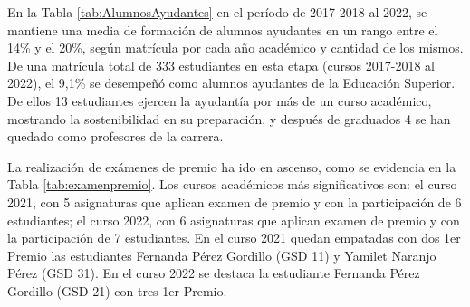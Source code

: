 En la Tabla \ref{tab:AlumnosAyudantes} en el período de 2017-2018 al 2022, se mantiene una media de formación de alumnos ayudantes en un rango entre el 14\% y el 20\%, según matrícula por cada año académico y cantidad de los mismos. De una matrícula total de 333 estudiantes en esta etapa (cursos 2017-2018 al 2022), el 9,1\% se desempeñó como alumnos ayudantes de la Educación Superior. De ellos 13 estudiantes ejercen la ayudantía por más de un curso académico, mostrando la sostenibilidad en su preparación, y después de graduados 4 se han quedado como profesores de la carrera. 

La realización de exámenes de premio ha ido en ascenso, como se evidencia en la  Tabla \ref{tab:examenpremio}. Los cursos académicos más significativos son: el curso 2021, con 5 asignaturas que aplican examen de premio y con la participación de 6 estudiantes; el curso 2022, con 6 asignaturas que aplican examen de premio y con la participación de 7 estudiantes. En el curso 2021 quedan empatadas con dos 1er Premio las estudiantes Fernanda Pérez Gordillo (GSD 11) y Yamilet Naranjo Pérez (GSD 31). En el curso 2022 se destaca la estudiante Fernanda Pérez Gordillo (GSD 21) con tres 1er Premio.

